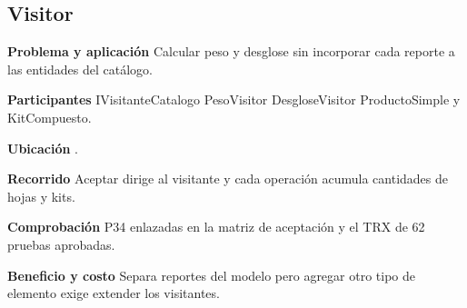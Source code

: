 \noindent\begin{minipage}{\linewidth}
\subsection{Visitor}
\textbf{Problema y aplicación} Calcular peso y desglose sin incorporar cada reporte a las entidades del catálogo.

\textbf{Participantes} IVisitanteCatalogo PesoVisitor DesgloseVisitor ProductoSimple y KitCompuesto.

\textbf{Ubicación} \href{https://github.com/Alan77-bot/LogiMarket360Alan/blob/68bda51063441415524ede51bdf61649ee9b4973/LogiMarket.Domain/Catalogo/PesoVisitor.cs#L5}{}.

\textbf{Recorrido} Aceptar dirige al visitante y cada operación acumula cantidades de hojas y kits.


\textbf{Comprobación} P34 enlazadas en la matriz de aceptación y el TRX de 62 pruebas aprobadas.

\textbf{Beneficio y costo} Separa reportes del modelo pero agregar otro tipo de elemento exige extender los visitantes.

\end{minipage}\par\smallskip
